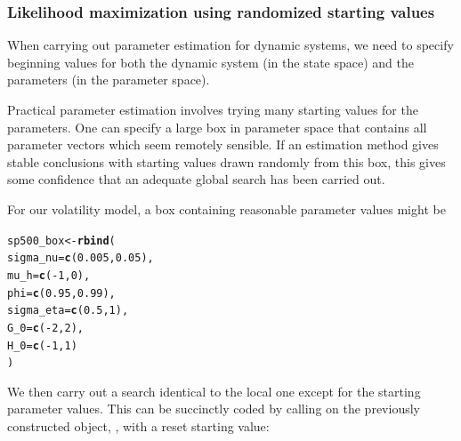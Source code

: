 \documentclass{beamer}\usepackage[]{graphicx}\usepackage[]{color}
\makeatletter
\newcommand{\hlnum}[1]{\textcolor[rgb]{0.686,0.059,0.569}{#1}}%
\newcommand{\hlopt}[1]{\textcolor[rgb]{0,0,0}{#1}}%
\newcommand{\hlstd}[1]{\textcolor[rgb]{0.345,0.345,0.345}{#1}}%
\newcommand{\hlkwb}[1]{\textcolor[rgb]{0.69,0.353,0.396}{#1}}%
\newcommand{\hlkwc}[1]{\textcolor[rgb]{0.333,0.667,0.333}{#1}}%
\newcommand{\hlkwd}[1]{\textcolor[rgb]{0.737,0.353,0.396}{\textbf{#1}}}%
\newenvironment{kframe}{%
 \def\at@end@of@kframe{}%
 \ifinner\ifhmode%
  \def\at@end@of@kframe{\end{minipage}}%
  \begin{minipage}{\columnwidth}%
 \fi\fi%
 \def\FrameCommand##1{\hskip\@totalleftmargin \hskip-\fboxsep
 \colorbox{shadecolor}{##1}\hskip-\fboxsep
     \hskip-\linewidth \hskip-\@totalleftmargin \hskip\columnwidth}%
 \MakeFramed {\advance\hsize-\width
   \@totalleftmargin\z@ \linewidth\hsize
   \@setminipage}}%
 {\par\unskip\endMakeFramed%
 \at@end@of@kframe}
\newenvironment{knitrout}{}{} %
\makeatother
\begin{document}
\begin{frame}[fragile]

\frametitle{Likelihood maximization using randomized starting values}

\bi

\item When carrying out parameter estimation for dynamic systems, we need to specify beginning values for both the dynamic system (in the state space) and the parameters (in the parameter space). 

\item Practical parameter estimation involves trying many starting values for the parameters. One can specify a large box in parameter space that contains all parameter vectors which seem remotely sensible. If an estimation method gives stable conclusions with starting values drawn randomly from this box, this gives some confidence that an adequate global search has been carried out. 

\item For our volatility model, a box containing reasonable parameter values might be

\ei

\begin{knitrout}\small
{}\color{fgcolor}\begin{kframe}
\begin{alltt}
\hlstd{sp500_box} \hlkwb{<-} \hlkwd{rbind}\hlstd{(}
 \hlkwc{sigma_nu}\hlstd{=}\hlkwd{c}\hlstd{(}\hlnum{0.005}\hlstd{,}\hlnum{0.05}\hlstd{),}
 \hlkwc{mu_h}    \hlstd{=}\hlkwd{c}\hlstd{(}\hlopt{-}\hlnum{1}\hlstd{,}\hlnum{0}\hlstd{),}
 \hlkwc{phi} \hlstd{=} \hlkwd{c}\hlstd{(}\hlnum{0.95}\hlstd{,}\hlnum{0.99}\hlstd{),}
 \hlkwc{sigma_eta} \hlstd{=} \hlkwd{c}\hlstd{(}\hlnum{0.5}\hlstd{,}\hlnum{1}\hlstd{),}
 \hlkwc{G_0} \hlstd{=} \hlkwd{c}\hlstd{(}\hlopt{-}\hlnum{2}\hlstd{,}\hlnum{2}\hlstd{),}
 \hlkwc{H_0} \hlstd{=} \hlkwd{c}\hlstd{(}\hlopt{-}\hlnum{1}\hlstd{,}\hlnum{1}\hlstd{)}
\hlstd{)}
\end{alltt}
\end{kframe}
\end{knitrout}

\bi

\item We then carry out a search identical to the local one except for the starting parameter values. This can be succinctly coded by calling  on the previously constructed object, , with a reset starting value:

\ei

\end{frame}
\end{document}
